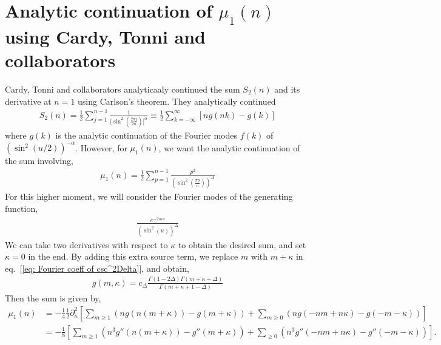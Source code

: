 \documentclass[11pt]{article}
\newcommand{\p}{\partial}
\newcommand{\nn}{\nonumber}
\newcommand{\lb}{\left(}
\newcommand{\rb}{\right)}
\begin{document}
\section{\texorpdfstring{Analytic continuation of $\mu_1(n)$ using Cardy, Tonni and collaborators}
{Analytic continuation of mu1(n) using Cardy, Tonni and collaborators}}
Cardy, Tonni and collaborators analyticaaly continued the sum $S_2(n)$ and its derivative at $n=1$ using Carlson's theorem. They analytically continued 
\begin{align*}
    S_2(n) = \frac{1}{2}\sum_{j=1}^{n-1} \frac{1}{\big[\sin^2\lb \frac{2\pi j}{2n} \rb\big]^\alpha} \equiv \frac{1}{2}\sum_{k = -\infty}^{\infty}[ng(nk)-g(k)]
\end{align*}
where $g(k)$ is the analytic continuation of the Fourier modes $f(k)$ of $\lb\sin^2(u/2)\rb^{-\alpha}$. However, for $\mu_1(n)$, we want the analytic continuation of the sum involving,
\begin{align}
    \mu_1(n) = \frac{1}{2}\sum_{p=1}^{n-1}\frac{p^2}{\lb \sin^2\lb \frac{\pi p}{n}\rb \rb^\Delta}
\end{align}
For this higher moment, we will consider the Fourier modes of the generating function,
\begin{align}
    \frac{e^{-2i\kappa u }}{(\sin^2(u))^\Delta}
\end{align}
We can take two derivatives with respect to $\kappa$ to obtain the desired sum, and set $\kappa= 0$ in the end. 
By adding this extra source term, we replace $m$ with $m + \kappa$ in eq.~[\ref{eq: Fourier coeff of csc^2Delta}], and obtain,
\begin{align}
    g(m,\kappa) = c_\Delta \frac{\Gamma(1-2\Delta) \Gamma(m + \kappa + \Delta)}{\Gamma(m+\kappa + 1 - \Delta)}
\end{align}
Then the sum is given by,
\begin{align}
    \mu_1(n) &= -\frac{1}{4}\frac{1}{2}\p_\kappa^2 \left[ \sum_{m\geq 1} \lb ng(n(m+\kappa)) - g(m+\kappa) \rb+ \sum_{m\geq 0}\lb ng(-nm+n\kappa) - g(-m-\kappa) \rb \right] \nn \\
    & = -\frac{1}{8} \left[ \sum_{m\geq 1}\lb n^3 g''(n(m+\kappa)) - g''(m+\kappa) \rb +\sum_{\geq 0}\lb n^3g''(-nm+n\kappa) -g''(-m-\kappa) \rb  \right].
\end{align}
\end{document}

